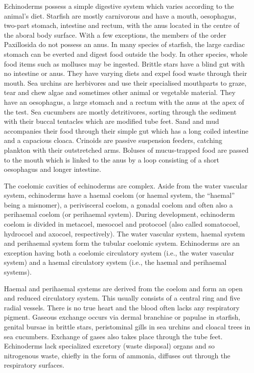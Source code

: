 Echinoderms possess a simple digestive system which varies according to the animal's diet. Starfish are mostly carnivorous and have a mouth, oesophagus, two-part stomach, intestine and rectum, with the anus located in the centre of the aboral body surface. With a few exceptions, the members of the order Paxillosida do not possess an anus. In many species of starfish, the large cardiac stomach can be everted and digest food outside the body. In other species, whole food items such as molluscs may be ingested. Brittle stars have a blind gut with no intestine or anus. They have varying diets and expel food waste through their mouth. Sea urchins are herbivores and use their specialised mouthparts to graze, tear and chew algae and sometimes other animal or vegetable material. They have an oesophagus, a large stomach and a rectum with the anus at the apex of the test. Sea cucumbers are mostly detritivores, sorting through the sediment with their buccal tentacles which are modified tube feet. Sand and mud accompanies their food through their simple gut which has a long coiled intestine and a capacious cloaca. Crinoids are passive suspension feeders, catching plankton with their outstretched arms. Boluses of mucus-trapped food are passed to the mouth which is linked to the anus by a loop consisting of a short oesophagus and longer intestine.

The coelomic cavities of echinoderms are complex. Aside from the water vascular system, echinoderms have a haemal coelom (or haemal system, the ``haemal'' being a misnomer), a perivisceral coelom, a gonadal coelom and often also a perihaemal coelom (or perihaemal system). During development, echinoderm coelom is divided in metacoel, mesocoel and protocoel (also called somatocoel, hydrocoel and axocoel, respectively). The water vascular system, haemal system and perihaemal system form the tubular coelomic system. Echinoderms are an exception having both a coelomic circulatory system (i.e., the water vascular system) and a haemal circulatory system (i.e., the haemal and perihaemal systems).

Haemal and perihaemal systems are derived from the coelom and form an open and reduced circulatory system. This usually consists of a central ring and five radial vessels. There is no true heart and the blood often lacks any respiratory pigment. Gaseous exchange occurs via dermal branchiae or papulae in starfish, genital bursae in brittle stars, peristominal gills in sea urchins and cloacal trees in sea cucumbers. Exchange of gases also takes place through the tube feet. Echinoderms lack specialized excretory (waste disposal) organs and so nitrogenous waste, chiefly in the form of ammonia, diffuses out through the respiratory surfaces.

